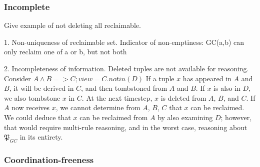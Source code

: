\documentclass{article}
\numberwithin{equation}{section}
\begin{document}
\subsubsection{Incomplete}
Give example of not deleting all reclaimable.

1. Non-uniqueness of reclaimable set. Indicator of non-emptiness: GC(a,b) can only reclaim one of a or b, but not both

2. Incompleteness of information. Deleted tuples are not available for reasoning.
Consider $A \wedge B => C; view = C.notin(D)$
If a tuple $x$ has appeared in $A$ and $B$, it will be derived in $C$, and then tombstoned from $A$ and $B$.
If $x$ is also in $D$, we also tombstone $x$ in $C$.
At the next timestep, $x$ is deleted from $A$, $B$, and $C$.
If $A$ now receives $x$, we cannot determine from $A$, $B$, $C$ that $x$ can be reclaimed.
We could deduce that $x$ can be reclaimed from $A$ by also examining $D$;
however, that would require multi-rule reasoning, and in the worst case, reasoning about $\mathfrak{P}_{GC}$ in its entirety.


\subsubsection{Coordination-freeness}
\end{document}
